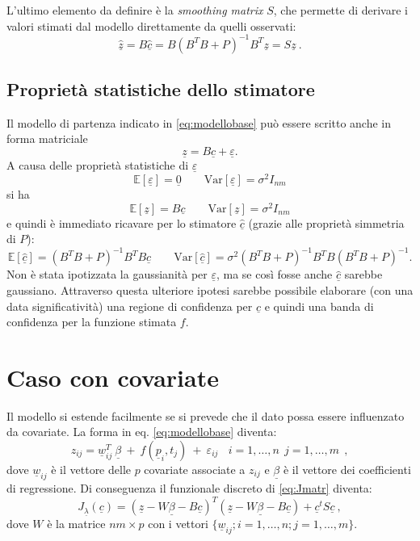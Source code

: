 \documentclass[a4paper,11pt,twoside,openright]{book}							%
\begin{document}
L'ultimo elemento da definire è la \textit{smoothing matrix} $S$, che permette di derivare i valori stimati dal modello direttamente da quelli osservati:
$$
\hat  {\underline z} =B\hat  {\underline c} = B(B^T B + P)^{-1}B^T \underline z = S\underline{z} \ .
$$



\subsection{Proprietà statistiche dello stimatore}
Il modello di partenza indicato in \ref{eq:modellobase} può essere scritto anche in forma matriciale
\begin{equation}
\label{eq:modellobasematric}
\underline z=B \underline c + \underline \varepsilon .
\end{equation}
A causa delle proprietà statistiche di $\underline \varepsilon$
$$
\mathbb{E}[\underline \varepsilon] = \underline 0 \qquad \mathrm{Var}[\underline \varepsilon] = \sigma^2 I_{nm}
$$
si ha
$$
\mathbb{E}[\underline z] = B \underline c \qquad \mathrm{Var}[\underline z] = \sigma^2 I_{nm}
$$
e quindi è immediato ricavare per lo stimatore $\hat  {\underline c}$ (grazie alle proprietà simmetria di $P$):
$$
\mathbb{E}[\hat  {\underline c}] = (B^T B + P)^{-1}B^TB \underline c \qquad \mathrm{Var}[\hat  {\underline c}] = \sigma^2 (B^T B + P)^{-1}B^TB(B^T B + P)^{-1} .
$$
Non è stata ipotizzata la gaussianità per $\underline \varepsilon$, ma se così fosse anche $\hat  {\underline c}$ sarebbe gaussiano. Attraverso questa ulteriore ipotesi sarebbe possibile elaborare (con una data significatività) una regione di confidenza per $\hat  {\underline c}$ e quindi una banda di confidenza per la funzione stimata $f$.


\section{Caso con covariate}
\label{sez:beta}
Il modello si estende facilmente se si prevede che il dato possa essere influenzato da covariate. La forma in eq. \ref{eq:modellobase} diventa:
\begin{equation}
\label{eq:modellobasecovar}
z_{ij}= \underline w_{ij}^T\  \underline \beta   \ + \  f(\underline p_i,t_j)\ +\ \varepsilon_{ij}\ \ \ \ i = 1,\ldots,n\ \ j=1,\ldots,m \ \ ,
\end{equation}
dove $\underline w_{ij}$ è il vettore delle $p$ covariate associate a $z_{ij}$ e $\underline \beta$ è il vettore dei coefficienti di regressione. Di conseguenza il funzionale discreto di \ref{eq:Jmatr} diventa:
$$ J_{\underline \lambda }(\underline c) = (\underline z - W \underline \beta - B \underline c)^T (\underline z - W \underline \beta - B \underline c) + \underline c^t S \underline c  \ ,$$
dove $W$ è la matrice $nm \times p$ con i vettori $ \{\underline w_{ij}; i=1,\ldots,n;j=1,\ldots,m\}$.
\end{document}

